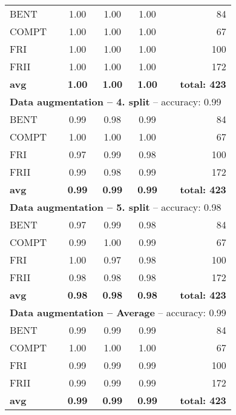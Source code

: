 \documentclass[fleqn,usenatbib]{mnras}
\begin{document}
\begin{table}
\begin{tabular}{lcccr}
		BENT &1.00  &1.00 & 1.00  & 84\\
		COMPT & 1.00 & 1.00 &   1.00 & 67\\
		FRI & 1.00 & 1.00 &  1.00 & 100\\
		FRII &1.00  &  1.00& 1.00 & 172\\
		\hline
		\textbf{avg} & \textbf{1.00}  &  \textbf{1.00}& \textbf{1.00} & \textbf{total: 423}\\
		\hline
		\multicolumn{5}{l}{\textbf{Data augmentation -- 4. split} -- accuracy: 0.99}   \\ \hline
		BENT & 0.99 & 0.98  & 0.99  &84 \\
		COMPT & 1.00 & 1.00 &   1.00    &67 \\
		FRI & 0.97 & 0.99 &  0.98 & 100\\
		FRII & 0.99 & 0.98 & 0.99 & 172\\
		\hline
		\textbf{avg} & \textbf{0.99}   & \textbf{0.99}  &\textbf{0.99}   & \textbf{total: 423}\\
		\hline
		\multicolumn{5}{l}{\textbf{Data augmentation -- 5. split} -- accuracy: 0.98}   \\ \hline
		BENT & 0.97 & 0.99 & 0.98  &84 \\
		COMPT & 0.99 & 1.00 &   0.99   &67 \\
		FRI &1.00 & 0.97 &   0.98  & 100\\
		FRII & 0.98 & 0.98 &   0.98  &172 \\
		\hline
		\textbf{avg} &  \textbf{0.98} & \textbf{0.98} &   \textbf{0.98}  & \textbf{total: 423}\\
		\hline \hline
	    \multicolumn{5}{l}{\textbf{Data augmentation -- Average} -- accuracy: 0.99 }  \\ \hline
		BENT & 0.99 & 0.99 & 0.99  &84 \\
		COMPT & 1.00 & 1.00 &   1.00   &67 \\
		FRI &0.99 & 0.99 &   0.99  & 100\\
		FRII & 0.99 & 0.99 &   0.99  &172 \\
		\hline
		\textbf{avg} &  \textbf{0.99} & \textbf{0.99} &   \textbf{0.99}  & \textbf{total: 423}\\
		\hline 
	\end{tabular}
\end{table}
\end{document}

